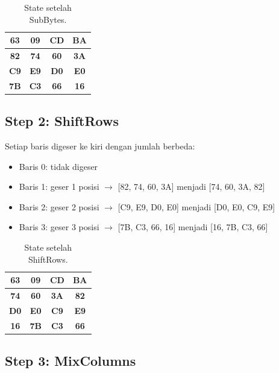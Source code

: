 \begin{table}[htbp]
  \centering
  \small
  \begin{tabular}{|c|c|c|c|}
    \hline
    \textbf{63} & \textbf{09} & \textbf{CD} & \textbf{BA} \\
    \hline
    \textbf{82} & \textbf{74} & \textbf{60} & \textbf{3A} \\
    \hline
    \textbf{C9} & \textbf{E9} & \textbf{D0} & \textbf{E0} \\
    \hline
    \textbf{7B} & \textbf{C3} & \textbf{66} & \textbf{16} \\
    \hline
  \end{tabular}
  \caption{State setelah SubBytes.}
\end{table}

\subsection{Step 2: ShiftRows}

Setiap baris digeser ke kiri dengan jumlah berbeda:
\begin{itemize}
  \item Baris 0: tidak digeser
  \item Baris 1: geser 1 posisi $\rightarrow$ [82, 74, 60, 3A] menjadi [74, 60, 3A, 82]
  \item Baris 2: geser 2 posisi $\rightarrow$ [C9, E9, D0, E0] menjadi [D0, E0, C9, E9]
  \item Baris 3: geser 3 posisi $\rightarrow$ [7B, C3, 66, 16] menjadi [16, 7B, C3, 66]
\end{itemize}

\begin{table}[htbp]
  \centering
  \small
  \begin{tabular}{|c|c|c|c|}
    \hline
    \textbf{63} & \textbf{09} & \textbf{CD} & \textbf{BA} \\
    \hline
    \textbf{74} & \textbf{60} & \textbf{3A} & \textbf{82} \\
    \hline
    \textbf{D0} & \textbf{E0} & \textbf{C9} & \textbf{E9} \\
    \hline
    \textbf{16} & \textbf{7B} & \textbf{C3} & \textbf{66} \\
    \hline
  \end{tabular}
  \caption{State setelah ShiftRows.}
\end{table}

\subsection{Step 3: MixColumns}

